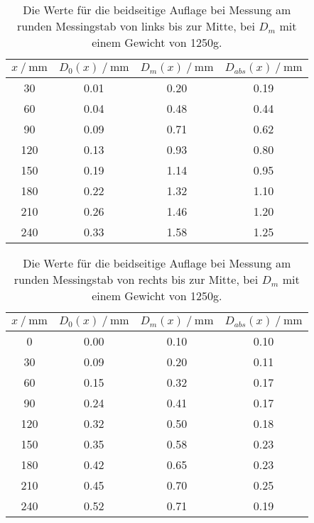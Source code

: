 \begin{table}[H]
  \centering
  \caption{Die Werte für die beidseitige Auflage bei Messung am runden Messingstab von links bis zur Mitte, bei $D_m$ mit 
  einem Gewicht von 1250g.}
  \begin{tabular}{cccc}
    \toprule
    {$x \mathbin{/} \unit{\milli\metre}$} &
    {$D_0(x) \mathbin{/} \unit{\milli\metre}$} &
    {$D_m(x) \mathbin{/} \unit{\milli\metre}$} &
    {$D_{abs}(x) \mathbin{/} \unit{\milli\metre}$} \\
    \midrule
     30 & 0.01 & 0.20 & 0.19 \\  
     60 & 0.04 & 0.48 & 0.44 \\
     90 & 0.09 & 0.71 & 0.62 \\
    120 & 0.13 & 0.93 & 0.80 \\
    150 & 0.19 & 1.14 & 0.95 \\
    180 & 0.22 & 1.32 & 1.10 \\
    210 & 0.26 & 1.46 & 1.20 \\
    240 & 0.33 & 1.58 & 1.25 \\
    
    \bottomrule
  \end{tabular}
  \label{tab:Tabelle5}
\end{table}



\begin{table}[H]
  \centering
  \caption{Die Werte für die beidseitige Auflage bei Messung am runden Messingstab von rechts bis zur Mitte, bei $D_m$ mit 
  einem Gewicht von 1250g.}
  \begin{tabular}{cccc}
    \toprule
    {$x \mathbin{/} \unit{\milli\metre}$} &
    {$D_0(x) \mathbin{/} \unit{\milli\metre}$} &
    {$D_m(x) \mathbin{/} \unit{\milli\metre}$} &
    {$D_{abs}(x) \mathbin{/} \unit{\milli\metre}$} \\
    \midrule
      0 & 0.00 & 0.10 & 0.10 \\
     30 & 0.09 & 0.20 & 0.11 \\  
     60 & 0.15 & 0.32 & 0.17 \\
     90 & 0.24 & 0.41 & 0.17 \\
    120 & 0.32 & 0.50 & 0.18 \\
    150 & 0.35 & 0.58 & 0.23 \\
    180 & 0.42 & 0.65 & 0.23 \\
    210 & 0.45 & 0.70 & 0.25 \\
    240 & 0.52 & 0.71 & 0.19 \\
    \bottomrule
  \end{tabular}
  \label{tab:Tabelle6}
\end{table}


